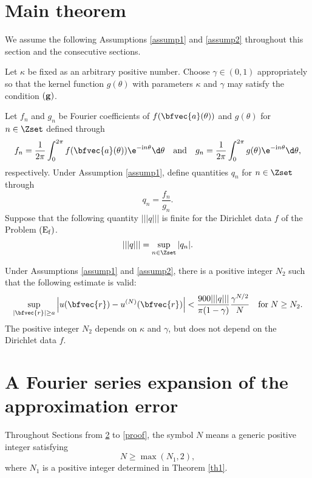 \section{Main theorem}
\label{main}
We assume the following Assumptions \ref{assump1} and \ref{assump2} throughout this section and the consecutive sections.
\begin{assum}
\label{assump1}
Let $\kappa$ be fixed as an arbitrary positive number. Choose $\gamma \in (0,1)$ appropriately so that the kernel function $g(\theta)$ with parameters $\kappa$ and $\gamma$ may satisfy the condition $({\bf g})$.
\end{assum}
\begin{assum}
\label{assump2}
Let $f_n$ and $g_n$ be Fourier coefficients of $f(\bfvec{a}(\theta))$ and $g(\theta)$ for $n \in \Zset$ defined through 
\begin{displaymath}
f_n=\frac{1}{2\pi}\int^{2\pi}_0 f(\bfvec{a}(\theta))\e^{-\mathrm{i}n\theta}\d\theta \quad{\rm and}\quad
g_n=\frac{1}{2\pi}\int^{2\pi}_0 g(\theta)\e^{-\mathrm{i}n\theta}\d\theta,
\end{displaymath}
respectively. Under Assumption \ref{assump1}, define quantities $q_n$ for $n \in \Zset$ through
\begin{displaymath}
q_n=\frac{f_n}{g_n}.
\end{displaymath}
Suppose that the following quantity $|||q|||$ is finite for the Dirichlet data $f$ of the Problem ${\rm (E_f)}$.
\begin{displaymath}
|||q|||=\sup_{n\in\Zset}|q_n|.
\end{displaymath}
\end{assum}

\begin{thm}
\label{main theorem}
Under Assumptions \ref{assump1} and \ref{assump2}, there is a positive integer $N_2$ such that the following estimate is valid:
\begin{displaymath}
\displaystyle \sup_{|\bfvec{r}| \ge a} \left|u(\bfvec{r})-u^{(N)}(\bfvec{r})\right| < \displaystyle \frac{900|||q|||}{\pi(1-\gamma)}\frac{\gamma^{N/2}}{N} \quad {\rm for}\;N \ge N_2.
\end{displaymath}
The positive integer $N_2$ depends on $\kappa$ and $\gamma$, but does not depend on the Dirichlet data $f$.
\end{thm}


\section{A Fourier series expansion of the approximation error}
\label{fourier-expansion}
Throughout Sections from \ref{fourier-expansion} to \ref{proof}, the symbol $N$ means a generic positive integer satisfying
\begin{displaymath}
N \ge \max(N_1,2),
\end{displaymath}
where $N_1$ is a positive integer determined in Theorem \ref{th1}.

